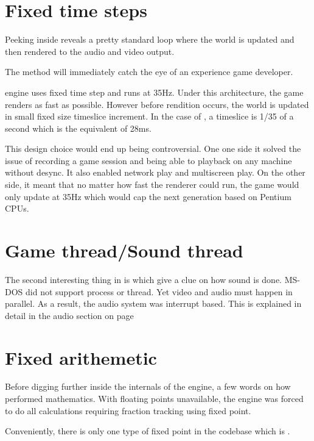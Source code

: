 \section{Fixed time steps}
Peeking inside  reveals a pretty standard loop where the world is updated and then rendered to the audio and video output.\\
\par
{}
The method  will immediately catch the eye of an experience game developer.\\
\par
{}
\par
\doom engine uses fixed time step and runs at 35Hz. Under this architecture, the game renders as fast as possible. However before rendition occurs, the world is updated in small fixed size timeslice increment. In the case of \doom, a timeslice is 1/35 of a second which is the equivalent of 28ms.\\
\par
{}
\par
This design choice would end up being controversial. One one side it solved the issue of recording a game session and being able to playback on any machine without desync. It also enabled network play and multiscreen play. On the other side, it meant that no matter how fast the renderer could run, the game would only update at 35Hz which would cap the next generation based on Pentium CPUs.\\
\par



\section{Game thread/Sound thread}
The second interesting thing in  is  which give a clue on how sound is done. MS-DOS did not support process or thread. Yet video and audio must happen in parallel. As a result, the audio system was interrupt based. This is explained in detail in the audio section on page \pageref{dmx_section}\\







\section{Fixed arithemetic}
Before digging further inside the internals of the engine, a few words on how \doom performed mathematics. With floating points unavailable, the engine was forced to do all calculations requiring fraction tracking using fixed point.\\
\par
Conveniently, there is only one type of fixed point in the codebase which is .\\
\par

